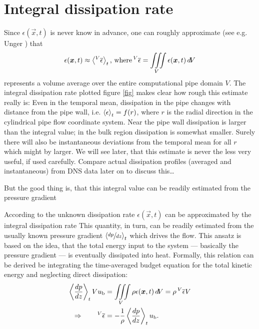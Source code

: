 \documentclass[a4paper, 11pt, twoside, DIV=12]{scrartcl}
\begin{document}
\section{Integral dissipation rate}
Since $\epsilon(\vec{x},t)$ is never know in advance, one can roughly
approximate (see e.g. Unger \cite{Unger1994}) that
\begin{align}
 \epsilon(\boldsymbol{x},t)\approx\left\langle\prescript{V}{}{\overline{\epsilon}}\right\rangle_{t}\text{, where}
 \prescript{V}{}{\overline{\epsilon}} = \iiint\limits_{V}\epsilon(\boldsymbol{x},t)\,d\! V
\end{align}
represents a volume average over the entire computational pipe domain $V$.
The integral dissipation rate plotted figure \ref{fig} makes clear how rough
this estimate really is: Even in the temporal mean, dissipation in the pipe
changes with distance from the pipe wall, i.e. $\left\langle\epsilon\right\rangle_{t}=f(r)$,
where $r$ is the radial direction in the cylindrical pipe flow coordinate
system. Near the pipe wall dissipation is larger than the integral value; in the
bulk region dissipation is somewhat smaller. Surely there will also be instantaneous deviations from the temporal
mean for all $r$ which might by larger. We will see later, that this estimate
is never the less very useful, if used carefully. Compare actual dissipation
profiles (averaged and instantaneous) from DNS data later on to discuss this\dots
\par
But the good thing is, that this integral value can be readily estimated from the pressure gradient

According to  the unknown dissipation rate
$\epsilon(\vec{x},t)$ can be approximated by the integral dissipation rate
 This quantity, in turn, can be readily
estimated from the usually known pressure gradient $\left\langle\sfrac{d p}{dz}\right\rangle_{t}$
which drives the flow. This ansatz is based on the idea, that the total energy
input to the system --- basically the pressure gradient --- is eventually
dissipated into heat. Formally, this relation can be derived be integrating the
time-averaged budget equation for the total kinetic energy and neglecting direct
dissipation:
\begin{align}
\left\langle\frac{d p}{dz}\right\rangle_{t}Vu_{\text{b}} & =
\iiint\limits_{V}\rho\epsilon(\boldsymbol{x},t)\,d\! V =
\rho\prescript{V}{}{\overline{\epsilon}} V\\
\Rightarrow\qquad\prescript{V}{}{\overline{\epsilon}} & =
-\frac{1}{\rho}\left\langle\frac{d p}{dz}\right\rangle_{t}u_{\text{b}}
\text{.}
\label{eq:volumeAveragedDissipation}
\end{align}
\end{document}
